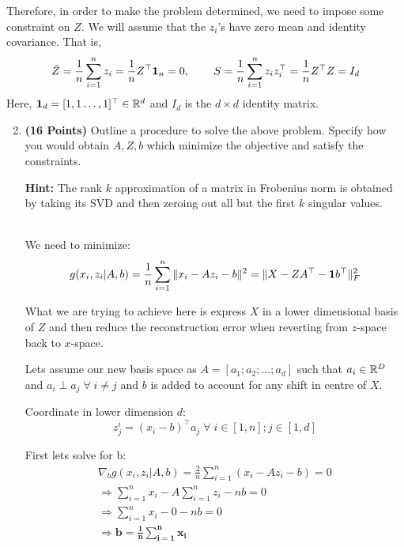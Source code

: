Therefore, in order to make the problem determined, we need to impose some
constraint on $Z$. We will assume that the $z_i$'s have zero mean and identity covariance.
That is,
\begin{align*}
\bar{Z} = \frac{1}{n} \sum_{i=1}^n z_i =\frac{1}{n} Z^\top {\bf 1}_n = 0, \hspace{0.3in} 
S = \frac{1}{n} \sum_{i=1}^n z_i z_i^\top 
= \frac{1}{n} Z^\top Z
= I_d
\end{align*}
Here, ${\bf 1}_d = [1, 1 \dots, 1]^\top \in\mathbb{R}^d$ and $I_d$  is the $d\times d$ identity matrix.

\begin{enumerate}
\setcounter{enumi}{1}
\item \textbf{(16 Points)}
Outline a procedure to solve the above problem. Specify how you
would obtain $A, Z, b$ which minimize the objective and satisfy the constraints.

\textbf{Hint: }The rank $k$ approximation of a matrix in Frobenius norm is obtained by
taking its SVD and then zeroing out all but the first $k$ singular values.

\begin{soln}\\
    We need to minimize:
    $$
        g(x_i,z_i|A,b) = \frac{1}{n} \sum_{i=1}^n \|x_i - Az_i - b\|^2 = \| X - ZA^\top - {\bf 1} b^\top\|_F^2
    $$
    
    What we are trying to achieve here is express $X$ in a lower dimensional basis of $Z$ and then reduce the reconstruction error when reverting from $z$-space back to $x$-space.
    
    Lets assume our new basis space as $A = [a_1;a_2;\dots;a_d]$ such that $a_i \in \mathbb{R}^D$ and $a_i \perp a_j \;\forall\;i\neq j$ and $b$ is added to account for any shift in centre of $X$.

    Coordinate in lower dimension $d$: 
    $$
        z^i_j=(x_i-b)^\top a_j\;\forall\;i\in[1,n];j\in[1,d]
    $$

    First lets solve for b:
    \begin{gather*}
        \nabla_b g(x_i,z_i|A,b) = \frac{2}{n}\sum_{i=1}^{n}(x_i - Az_i -b) = 0 \\
        \Rightarrow \sum_{i=1}^{n}x_i - A\sum_{i=1}^{n}z_i - nb = 0 \\
        \Rightarrow \sum_{i=1}^{n}x_i - 0 - nb = 0 \\
        \Rightarrow \mathbf{b = \frac{1}{n}\sum_{i=1}^{n}x_i}
    \end{gather*}
    

\end{soln}
\end{enumerate}
